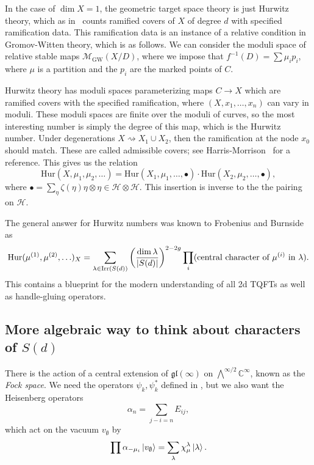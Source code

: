 \documentclass[leqno, openany]{memoir}
\theoremstyle{definition}
\theoremstyle{remark}
\theoremstyle{plain}
\theoremstyle{definition}
\theoremstyle{remark}
\newcommand{\C}{\mathbb{C}}
\newcommand{\mc}[1]{\mathcal{#1}}
\newcommand{\mf}[1]{\mathfrak{#1}}
\newcommand{\mr}[1]{\mathrm{#1}}
\begin{document}
In the case of $\dim X = 1$, the geometric target space theory is just Hurwitz theory, which as in~ counts ramified covers of $X$ of degree $d$ with specified ramification data. This ramification data is an instance of a relative condition in Gromov-Witten theory, which is as follows. We can consider the moduli space of relative stable maps $\mc{M}_{\mr{GW}}(X/D)$, where we impose that $f^{-1}(D) = \sum \mu_i p_i$, where $\mu$ is a partition and the $p_i$ are the marked points of $C$.

Hurwitz theory has moduli spaces parameterizing maps $C \to X$ which are ramified covers with the specified ramification, where $(X, x_1, \ldots, x_n)$ can vary in moduli. These moduli spaces are finite over the moduli of curves, so the most interesting number is simply the degree of this map, which is the Hurwitz number. Under degenerations $X \rightsquigarrow X_1 \cup X_2$, then the ramification at the node $x_0$ should match. These are called admissible covers; see Harris-Morrison~\cite{harmor} for a reference. This gives us the relation
\[ \mr{Hur}(X, \mu_1, \mu_2, \ldots) = \mr{Hur}(X_1, \mu_1, \ldots, \bullet) \cdot \mr{Hur}(X_2, \mu_2, \ldots, \bullet), \]
where $\bullet = \sum_{\eta} \zeta(\eta) \eta \otimes \eta \in \mc{H} \otimes \mc{H}$. This insertion is inverse to the the pairing on $\mc{H}$.

The general answer for Hurwitz numbers was known to Frobenius and Burnside as
\[ \mr{Hur}(\mu^{(1)}, \mu^{(2)}, \ldots)_X = \sum_{\lambda \in \mr{Irr}(S(d))} \qty(\frac{\dim \lambda}{\abs{S(d)}})^{2-2g} \prod_i (\text{central character of }\mu^{(i)}\text{ in }\lambda). \]
This contains a blueprint for the modern understanding of all 2d TQFTs as well as handle-gluing operators.

\subsection{More algebraic way to think about characters of $S(d)$}

There is the action of a central extension of $\mf{gl}(\infty)$ on $\bigwedge^{\infty/2} \C^{\infty}$, known as the \textit{Fock space}. We need the operators $\psi_k, \psi_k^*$ defined in , but we also want the Heisenberg operators
\[ \alpha_n = \sum_{j-i=n} E_{ij}, \]
which act on the vacuum $v_{\emptyset}$ by
\[ \prod \alpha_{-\mu_i} \ket{v_{\emptyset}} = \sum_{\lambda} \chi_{\mu}^{\lambda} \ket{\lambda}. \]
\end{document}
